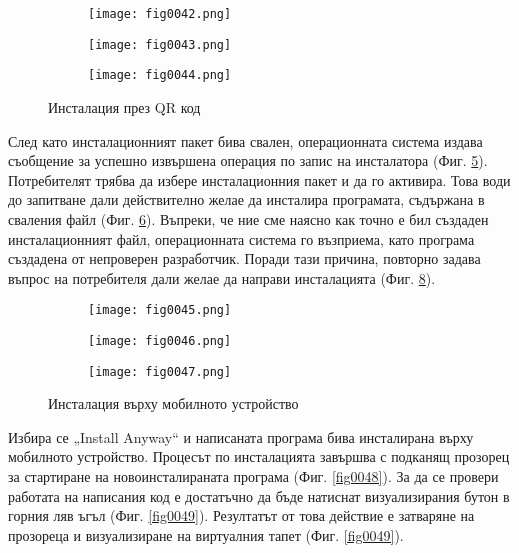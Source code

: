 \begin{figure}[H]
  \begin{subfigure}{0.31\textwidth}
  \texttt{[image: fig0042.png]}
  \label{fig0042}
  \end{subfigure}
  \begin{subfigure}{0.31\textwidth}
  \texttt{[image: fig0043.png]}
  \label{fig0043}
  \end{subfigure}
  \begin{subfigure}{0.31\textwidth}
  \texttt{[image: fig0044.png]}
  \label{fig0044}
  \end{subfigure}
  \caption{Инсталация през QR код}
\end{figure}

След като инсталационният пакет бива свален, операционната система издава съобщение за успешно извършена операция по запис на инсталатора (Фиг. \ref{fig0045}). Потребителят трябва да избере инсталационния пакет и да го активира. Това води до запитване дали действително желае да инсталира програмата, съдържана в сваления файл (Фиг. \ref{fig0046}). Въпреки, че ние сме наясно как точно е бил създаден инсталационният файл, операционната система го възприема, като програма създадена от непроверен разработчик. Поради тази причина, повторно задава въпрос на потребителя дали желае да направи инсталацията (Фиг. \ref{fig0047}). 

\begin{figure}[H]
  \begin{subfigure}{0.31\textwidth}
  \texttt{[image: fig0045.png]}
  \label{fig0045}
  \end{subfigure}
  \begin{subfigure}{0.31\textwidth}
  \texttt{[image: fig0046.png]}
  \label{fig0046}
  \end{subfigure}
  \begin{subfigure}{0.31\textwidth}
  \texttt{[image: fig0047.png]}
  \label{fig0047}
  \end{subfigure}
  \caption{Инсталация върху мобилното устройство}
\end{figure}

Избира се „Install Anyway“ и написаната програма бива инсталирана върху мобилното устройство. Процесът по инсталацията завършва с подканящ прозорец за стартиране на новоинсталираната програма (Фиг. \ref{fig0048}). За да се провери работата на написания код е достатъчно да бъде натиснат визуализирания бутон в горния ляв ъгъл (Фиг. \ref{fig0049}). Резултатът от това действие е затваряне на прозореца и визуализиране на виртуалния тапет (Фиг. \ref{fig0049}).

